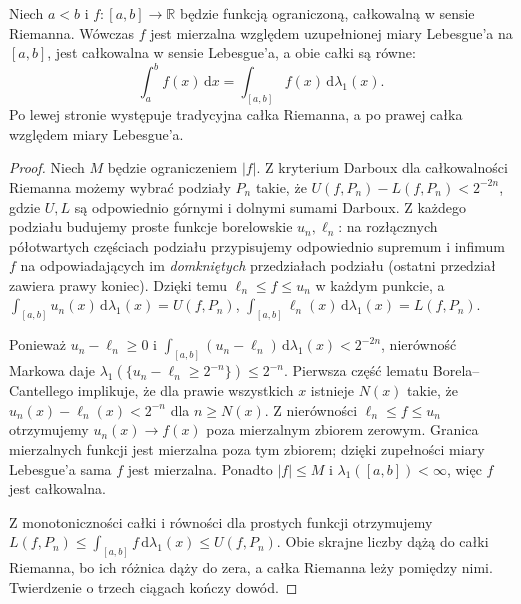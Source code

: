 \begin{twierdzenie}
\label{thm:riemann-to-lebesgue}
Niech $a<b$ i $f:[a,b]\to\mathbb R$ będzie funkcją
ograniczoną, całkowalną w sensie Riemanna.
Wówczas $f$ jest mierzalna względem uzupełnionej
miary Lebesgue'a na $[a,b]$, jest całkowalna
w sensie Lebesgue'a, a obie całki są równe:
\[
\int_a^b f(x)\,\mathrm dx
=\int_{[a,b]}f(x)\,\mathrm d\lambda_1(x).
\]
Po lewej stronie występuje tradycyjna całka Riemanna,
a po prawej całka względem miary Lebesgue'a.
\end{twierdzenie}
\begin{proof}
Niech $M$ będzie ograniczeniem $|f|$.
Z kryterium Darboux dla całkowalności Riemanna
możemy wybrać podziały $P_n$ takie, że
$U(f,P_n)-L(f,P_n)<2^{-2n}$,
gdzie $U,L$ są odpowiednio górnymi i dolnymi
sumami Darboux. Z każdego podziału budujemy
proste funkcje borelowskie $u_n,\ell_n$:
na rozłącznych półotwartych częściach podziału
przypisujemy odpowiednio supremum i infimum $f$
na odpowiadających im \emph{domkniętych} przedziałach
podziału (ostatni przedział zawiera prawy koniec).
Dzięki temu $\ell_n\le f\le u_n$ w każdym punkcie,
a $\int_{[a,b]}u_n(x)\,\mathrm d\lambda_1(x)=U(f,P_n)$,
$\int_{[a,b]}\ell_n(x)\,\mathrm d\lambda_1(x)=L(f,P_n)$.

Ponieważ $u_n-\ell_n\ge0$ i
$\int_{[a,b]}(u_n-\ell_n)\,\mathrm d\lambda_1(x)
<2^{-2n}$, nierówność Markowa daje
$\lambda_1(\{u_n-\ell_n\ge2^{-n}\})\le2^{-n}$.
Pierwsza część lematu Borela--Cantellego implikuje,
że dla prawie wszystkich $x$ istnieje $N(x)$ takie,
że $u_n(x)-\ell_n(x)<2^{-n}$ dla $n\ge N(x)$.
Z nierówności $\ell_n\le f\le u_n$ otrzymujemy
$u_n(x)\to f(x)$ poza mierzalnym zbiorem zerowym.
Granica mierzalnych funkcji jest mierzalna poza
tym zbiorem; dzięki zupełności miary Lebesgue'a
sama $f$ jest mierzalna. Ponadto $|f|\le M$
i $\lambda_1([a,b])<\infty$, więc $f$ jest całkowalna.

Z monotoniczności całki i równości dla prostych
funkcji otrzymujemy
$L(f,P_n)\le\int_{[a,b]}f\,\mathrm d\lambda_1(x)
\le U(f,P_n)$. Obie skrajne liczby dążą do
całki Riemanna, bo ich różnica dąży do zera,
a całka Riemanna leży pomiędzy nimi.
Twierdzenie o trzech ciągach kończy dowód.
\end{proof}

